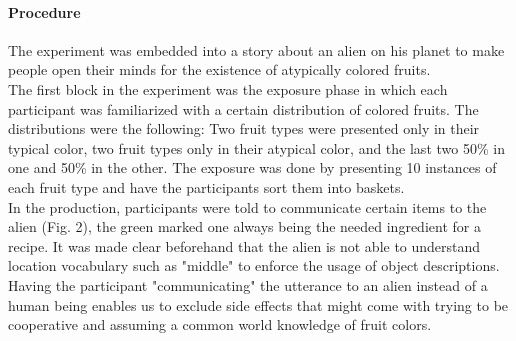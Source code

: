 \documentclass[10pt,letterpaper]{article}
\begin{document}
\paragraph{Procedure}
The experiment was embedded into a story about an alien on his planet to make people open their minds for the existence of atypically colored fruits.\\The first block in the experiment was the exposure phase in which each participant was familiarized with a certain distribution of colored fruits. The distributions were the following: Two fruit types were presented only in their typical color, two fruit types only in their atypical color, and the last two 50\% in one and 50\% in the other. The exposure was done by presenting 10 instances of each fruit type and have the participants sort them into baskets.\\In the production, participants were told to communicate certain items to the alien (Fig. 2), the green marked one always being the needed ingredient for a recipe. It was made clear beforehand that the alien is not able to understand location vocabulary such as "middle" to enforce the usage of object descriptions. Having the participant "communicating" the utterance to an alien instead of a human being enables us to exclude side effects that might come with trying to be cooperative and assuming a common world knowledge of fruit colors.
\end{document}
